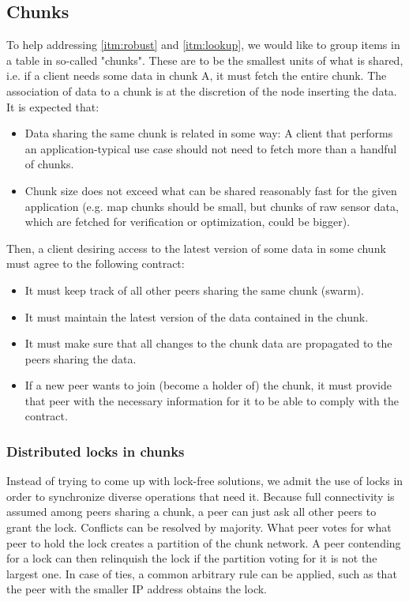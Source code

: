 \documentclass[a4paper, 10pt, conference]{ieeeconf}
\begin{document}
\subsection{Chunks}

To help addressing \ref{itm:robust} and \ref{itm:lookup}, we would like to
group items in a table in so-called "chunks". These are to be the smallest units
of what is shared, i.e. if a client needs some data in chunk A, it must fetch
the entire chunk. The association of data to a chunk
is at the discretion of the node inserting the data. It is expected that:

\begin{itemize}
  \itemsep0em
  \item Data sharing the same chunk is related in some way: A client that
    performs an application-typical use case should not need to fetch more than
    a handful of chunks.
  \item Chunk size does not exceed what can be shared reasonably fast for the
    given application (e.g. map chunks should be small, but chunks of raw
    sensor data, which are fetched for verification or optimization, 
    could be bigger).
\end{itemize}

Then, a client desiring access to the latest version of some data in some chunk
must agree to the following contract:

\begin{itemize}
  \itemsep0em
  \item It must keep track of all other peers sharing the same chunk (swarm).
  \item It must maintain the latest version of the data contained in the chunk.
  \item It must make sure that all changes to the chunk data are propagated to
    the peers sharing the data.
  \item If a new peer wants to join (become a holder of) the chunk, it must 
    provide that peer with the necessary information for it to be able to comply
    with the contract.
\end{itemize}

\subsubsection{Distributed locks in chunks}

Instead of trying to come up with lock-free solutions, we admit the use of
locks in order to synchronize diverse operations that need it. Because full
connectivity is assumed among peers sharing a chunk, a peer can just ask all
other peers to grant the lock. Conflicts can be resolved by majority. What peer
votes for what peer to hold the lock creates a partition of the chunk network.
A peer contending for a lock can then relinquish the lock if the partition 
voting for it is not the largest one. In case of ties, a common arbitrary rule
can be applied, such as that the peer with the smaller IP address obtains the
lock.
\end{document}
